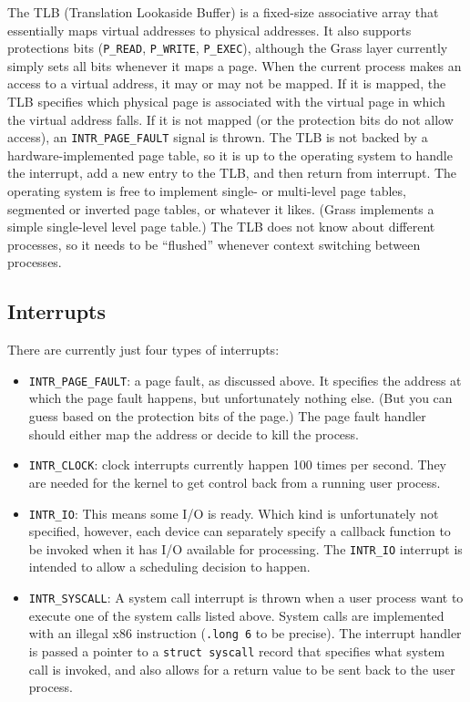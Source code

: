 \documentclass{article}
\begin{document}
The TLB (Translation Lookaside Buffer) is a fixed-size associative
array that essentially maps virtual addresses to physical addresses.
It also supports protections bits (\texttt{P\_READ}, \texttt{P\_WRITE},
\texttt{P\_EXEC}), although the Grass layer currently simply sets all
bits whenever it maps a page.
When the current process makes an access to a virtual address, it may
or may not be mapped.
If it is mapped, the TLB specifies which physical page is associated
with the virtual page in which the virtual address falls.
If it is not mapped (or the protection bits do not allow access),
an \texttt{INTR\_PAGE\_FAULT} signal is thrown.
The TLB is not backed by a hardware-implemented page table, so it is
up to the operating system to handle the interrupt, add a new entry
to the TLB, and then return from interrupt.
The operating system is free to implement single- or multi-level page
tables, segmented or inverted page tables, or whatever it likes.
(Grass implements a simple single-level level page table.)
The TLB does not know about different processes, so it needs to be
``flushed'' whenever context switching between processes.

\subsection{Interrupts}

There are currently just four types of interrupts:

\begin{itemize}
\item \texttt{INTR\_PAGE\_FAULT}: a page fault, as discussed above.
It specifies the address at which the page fault happens, but
unfortunately nothing else.  (But you can guess based on the protection
bits of the page.)  The page fault handler should either
map the address or decide to kill the process.
\item \texttt{INTR\_CLOCK}: clock interrupts currently happen 100 times
per second.  They are needed for the kernel to get control back from
a running user process.
\item \texttt{INTR\_IO}:
This means some I/O is ready.  Which kind is unfortunately not specified,
however, each device can separately specify a callback function to be invoked
when it has I/O available for processing.  The \texttt{INTR\_IO} interrupt is
intended to allow a scheduling decision to happen.
\item \texttt{INTR\_SYSCALL}:
A system call interrupt is thrown when a user process want to execute
one of the system calls listed above.  System calls are implemented with
an illegal x86 instruction (\texttt{.long 6} to be precise).  The interrupt
handler is passed a pointer to a \texttt{struct syscall} record that
specifies what system call is invoked, and also allows for a return value
to be sent back to the user process.
\end{itemize}
\end{document}
